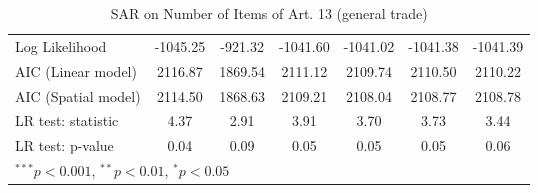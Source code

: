 \begin{table}[!h]
\begin{center}
\begin{tabular}{l c c c c c c }
Log Likelihood          & -1045.25   & -921.32    & -1041.60    & -1041.02    & -1041.38    & -1041.39    \\
AIC (Linear model)      & 2116.87    & 1869.54    & 2111.12     & 2109.74     & 2110.50     & 2110.22     \\
AIC (Spatial model)     & 2114.50    & 1868.63    & 2109.21     & 2108.04     & 2108.77     & 2108.78     \\
LR test: statistic      & 4.37       & 2.91       & 3.91        & 3.70        & 3.73        & 3.44        \\
LR test: p-value        & 0.04       & 0.09       & 0.05        & 0.05        & 0.05        & 0.06        \\
\bottomrule
\multicolumn{7}{l}{\scriptsize{$^{***}p<0.001$, $^{**}p<0.01$, $^*p<0.05$}}
\end{tabular}
\caption{SAR on Number of Items of Art. 13 (general trade)}
\label{table:coefficients}
\end{center}
\end{table}
